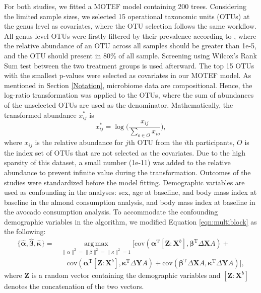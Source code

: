 \documentclass[smallextended]{svjour3}
\DeclareMathOperator*{\argmax}{arg\,max}
\newcommand{\trnp}{^\text{T}}
\begin{document}
For both studies, we fitted a MOTEF model containing 200 trees. Considering the limited sample sizes, we selected 15 operational taxonomic units (OTUs) at the genus level as covariates, where the OTU selection follows the same workflow. All genus-level OTUs were firstly filtered by their prevalence according to \cite{callahan2016bioconductor}, where the relative abundance of an OTU across all samples should be greater than 1e-5, and the OTU should present in 80\% of all sample. Screening using Wilcox's Rank Sum test between the two treatment groups is used afterward. The top 15 OTUs with the smallest p-values were selected as covariates in our MOTEF model. As mentioned in Section \ref{Notation}, microbiome data are compositional. Hence, the log-ratio transformation was applied to the OTUs, where the sum of abundances of the unselected OTUs are used as the denominator. Mathematically, the transformed abundance $x_{ij}^*$ is
\begin{equation*}
    x_{ij}^* = \log\Big(\frac{x_{ij}}{\sum\limits_{o \in O} x_{io}}\Big),    
\end{equation*}
where $x_{ij}$ is the relative abundance for $j$th OTU from the $i$th participants,
$O$ is the index set of OTUs that are not selected as the covariates. Due to the high sparsity of this dataset, a small number (1e-11) was added to the relative abundance to prevent infinite value during the transformation. Outcomes of the studies were standardized before the model fitting. Demographic variables are used as confounding in the analyses: sex, age at baseline, and body mass index at baseline in the almond consumption analysis, and body mass index at baseline in the avocado consumption analysis. To accommodate the confounding demographic variables in the algorithm, we modified Equation \eqref{eqn:multiblock} as the following:
\begin{align}
\{\bm{\widehat{\alpha}}, \bm{\widehat{\beta}}, \bm{\widehat{\kappa}}\} = & \argmax\limits_{\lVert\alpha\rVert^2 = \lVert\beta\rVert^2 = \lVert\kappa\rVert^2 = 1}
\Big[ \text{cov}( \bm \alpha\trnp \left[ \bm Z : \bm{X}^b\right], \bm \beta \trnp \Delta \bm{X} A ) + \nonumber \\ 
&\quad \text{cov} (\bm \alpha\trnp \left[ \bm Z : \bm{X}^b\right], \bm \kappa \trnp \Delta \bm{Y} A) +\text{cov}(\bm \beta\trnp \Delta \bm{X} A, \bm \kappa\trnp \Delta \bm{Y} A ) \Big], \label{eqn:multiblock2}
\end{align}
where $\bm Z$ is a random vector containing the demographic variables and $\left[\bm Z:\bm X^b\right]$ denotes the concatenation of the two vectors.
\end{document}
